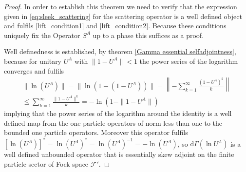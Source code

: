 \documentclass[b5paper,draft,openbib,12pt]{memoir}
\begin{document}
\begin{proof}
In order to establish this theorem we need to verify that the expression given in \eqref{eq:sleek_scattering} for the scattering operator
 is a well defined object
and fulfils \eqref{lift_condition1} and \eqref{lift_condition2}. Because these conditions uniquely fix the Operator \(S^A\)  up to a phase this suffices as a proof.

Well definedness is established, by theorem \ref{Gamma essential selfadjointness}, because for unitary \(U^A\)
with \(\|1-U^A\|<1\) the power series of the logarithm converges and fulfils
\begin{align}
\|\ln(U^A)\|=\|\ln (1-(1-U^A))\|= \left\| -\sum_{k=1}^\infty \frac{(1-U^A)^k}{k} \right\|\\
 \le   \sum_{k=1}^\infty \frac{\|1-U^A\|^k}{k}=-\ln(1-\|1-U^A\|)
\end{align}
implying that the power series of the logarithm around the 
identity is a well defined map from the one particle 
operators of norm less than
one to the bounded one particle operators. Moreover this 
operator fulfils \([\ln (U^A)]^*=\ln (U^A)^*= \ln 
(U^A)^{-1}=-\ln (U^A)\), so 
\(\mathrm{d}\Gamma(\ln U^A)\) is a well defined unbounded 
operator that is essentially skew adjoint on the finite 
particle sector of Fock space \(\mathcal{F}'\).



\end{proof}
\end{document}
